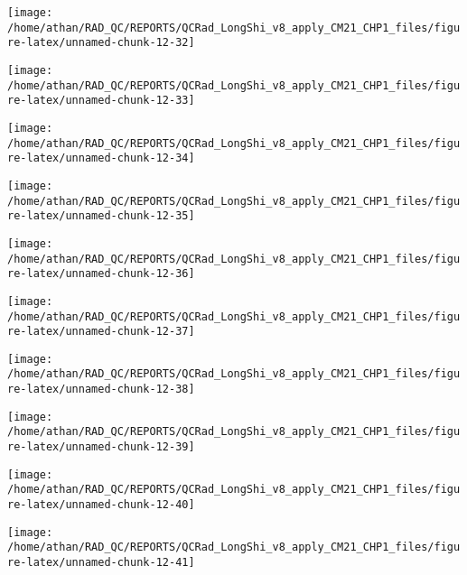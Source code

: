 \documentclass[
  10pt,
  a4paper,oneside]{article}
\begin{document}
\begin{center}\texttt{[image: /home/athan/RAD\_QC/REPORTS/QCRad\_LongShi\_v8\_apply\_CM21\_CHP1\_files/figure-latex/unnamed-chunk-12-32]} \end{center}

\begin{center}\texttt{[image: /home/athan/RAD\_QC/REPORTS/QCRad\_LongShi\_v8\_apply\_CM21\_CHP1\_files/figure-latex/unnamed-chunk-12-33]} \end{center}

\begin{center}\texttt{[image: /home/athan/RAD\_QC/REPORTS/QCRad\_LongShi\_v8\_apply\_CM21\_CHP1\_files/figure-latex/unnamed-chunk-12-34]} \end{center}

\begin{center}\texttt{[image: /home/athan/RAD\_QC/REPORTS/QCRad\_LongShi\_v8\_apply\_CM21\_CHP1\_files/figure-latex/unnamed-chunk-12-35]} \end{center}

\begin{center}\texttt{[image: /home/athan/RAD\_QC/REPORTS/QCRad\_LongShi\_v8\_apply\_CM21\_CHP1\_files/figure-latex/unnamed-chunk-12-36]} \end{center}

\begin{center}\texttt{[image: /home/athan/RAD\_QC/REPORTS/QCRad\_LongShi\_v8\_apply\_CM21\_CHP1\_files/figure-latex/unnamed-chunk-12-37]} \end{center}

\begin{center}\texttt{[image: /home/athan/RAD\_QC/REPORTS/QCRad\_LongShi\_v8\_apply\_CM21\_CHP1\_files/figure-latex/unnamed-chunk-12-38]} \end{center}

\begin{center}\texttt{[image: /home/athan/RAD\_QC/REPORTS/QCRad\_LongShi\_v8\_apply\_CM21\_CHP1\_files/figure-latex/unnamed-chunk-12-39]} \end{center}

\begin{center}\texttt{[image: /home/athan/RAD\_QC/REPORTS/QCRad\_LongShi\_v8\_apply\_CM21\_CHP1\_files/figure-latex/unnamed-chunk-12-40]} \end{center}

\begin{center}\texttt{[image: /home/athan/RAD\_QC/REPORTS/QCRad\_LongShi\_v8\_apply\_CM21\_CHP1\_files/figure-latex/unnamed-chunk-12-41]} \end{center}
\end{document}
